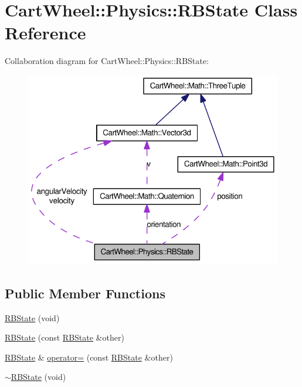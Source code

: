 \hypertarget{classCartWheel_1_1Physics_1_1RBState}{
\section{CartWheel::Physics::RBState Class Reference}
\label{classCartWheel_1_1Physics_1_1RBState}
}


Collaboration diagram for CartWheel::Physics::RBState:\nopagebreak
\begin{figure}[H]
\begin{center}
\leavevmode
\includegraphics[width=354pt]{classCartWheel_1_1Physics_1_1RBState__coll__graph}
\end{center}
\end{figure}
\subsection*{Public Member Functions}
\begin{DoxyCompactItemize}
\item 
\hyperlink{classCartWheel_1_1Physics_1_1RBState_a249b7b56d21fb43151ee309d5d097fd1}{RBState} (void)
\item 
\hyperlink{classCartWheel_1_1Physics_1_1RBState_acbba6a75b02312ce0faf57e172e94aa8}{RBState} (const \hyperlink{classCartWheel_1_1Physics_1_1RBState}{RBState} \&other)
\item 
\hyperlink{classCartWheel_1_1Physics_1_1RBState}{RBState} \& \hyperlink{classCartWheel_1_1Physics_1_1RBState_a970328d7cb83ce5e4a87b52e5d9687ac}{operator=} (const \hyperlink{classCartWheel_1_1Physics_1_1RBState}{RBState} \&other)
\item 
\hyperlink{classCartWheel_1_1Physics_1_1RBState_ab54c2648338e46616b8903973e848f8e}{$\sim$RBState} (void)
\end{DoxyCompactItemize}
